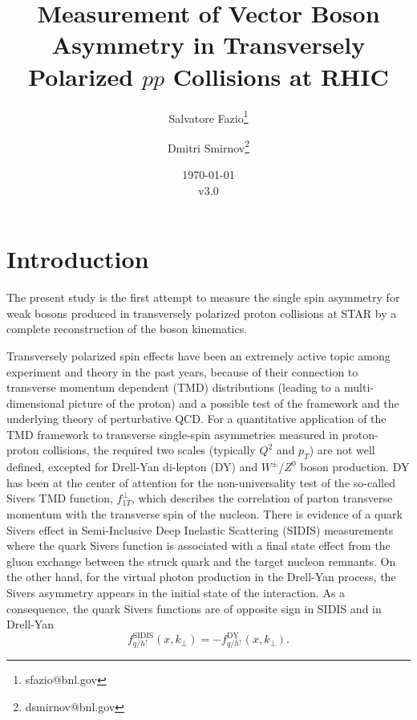 \documentclass[12pt]{article}
\begin{document}
\setcounter{section}{0}
\setcounter{subsection}{0}
\setcounter{equation}{0}
\setcounter{figure}{0}
\setcounter{footnote}{0}
\setcounter{table}{0}

\title{Measurement of Vector Boson Asymmetry in Transversely Polarized $pp$
Collisions at RHIC}

\author{Salvatore Fazio\thanks{sfazio@bnl.gov}}
\author{Dmitri Smirnov\thanks{dsmirnov@bnl.gov}}

\date{\today\\v3.0}

\maketitle

\newpage
\tableofcontents 

\newpage
\linenumbers


\section{Introduction}

The present study is the first attempt to measure the single spin asymmetry for weak bosons produced
in transversely polarized proton collisions at STAR by a complete reconstruction of the boson kinematics. 

Transversely polarized spin effects have been an extremely active topic among experiment and theory in the past years, because of their connection to transverse momentum dependent (TMD) distributions (leading to a multi-dimensional picture of the proton) and a possible test of the framework and the underlying theory of perturbative QCD. For a quantitative application of the TMD framework to transverse single-spin asymmetries measured in proton-proton collisions, the required two scales (typically $Q^{2}$ and $p_{T}$) are not well defined, excepted for Drell-Yan di-lepton (DY) and $W^{\pm}$/$Z^{0}$ boson production. DY has been at the center of attention for the non-universality test of the so-called Sivers TMD function, %
$f^{\perp}_{1T}$, which describes the correlation of parton transverse momentum with the transverse spin of the nucleon.  There is evidence of a quark Sivers effect in Semi-Inclusive Deep Inelastic Scattering (SIDIS) measurements where the quark Sivers function is associated with a final state effect from the gluon exchange between the struck quark and the target nucleon remnants. On the other hand, for the virtual photon production in the Drell-Yan process, the Sivers asymmetry appears in the initial state of the interaction. As a consequence, the quark Sivers functions are of opposite sign in SIDIS and in Drell-Yan
%
\begin{equation}
f^\text{SIDIS}_{q/h^\uparrow} (x, k_\perp) = - f^\text{DY}_{q/h^\uparrow} (x, k_\perp).
\end{equation}
\end{document}

